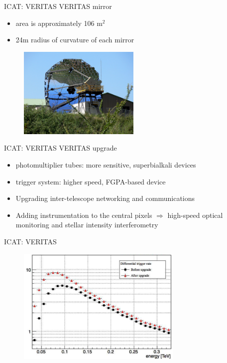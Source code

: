 \documentclass{beamer}
\begin{document}
\begin{frame}{ICAT: VERITAS}
    VERITAS mirror
    \begin{itemize}
        \item area is approximately 106 $\text{m}^2$
        \item  24m radius of curvature of each mirror
    \end{itemize}

    \begin{figure}[h]
        \includegraphics[width=220px]{VERITAS_mirror.jpg}
    \end{figure}
\end{frame}


\begin{frame}{ICAT: VERITAS}
    VERITAS upgrade
    \begin{itemize}
        \item  photomultiplier tubes: more sensitive, superbialkali devices
        \item trigger system: higher speed, FGPA-based device
        \item Upgrading inter-telescope networking and communications
        \item Adding instrumentation to the central pixels $\Rightarrow$ high-speed optical monitoring and stellar intensity interferometry
    \end{itemize}
\end{frame}



\begin{frame}{ICAT: VERITAS}
    \begin{figure}[h]
        \includegraphics[width=300px]{VERITAS_upgrade.png}
    \end{figure}
\end{frame}
\end{document}
